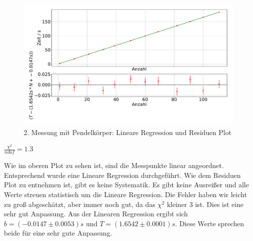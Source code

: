 \documentclass[twoside]{protokoll}
\begin{document}
\begin{figure}[H]
    \centering
    \includegraphics[width=1.0\textwidth]{plots/lineare_regression_gewicht_2.pdf}
    \caption{2. Messung mit Pendelkörper: Lineare Regression und Residuen Plot}
\end{figure}
\begin{center}
    $ \frac{\chi^2}{ndof}  =  1.3$
\end{center}
Wie im oberen Plot zu sehen ist, sind die Messpunkte linear angeordnet.
Entsprechend wurde eine Lineare Regression durchgeführt.
Wie dem Residuen Plot zu entnehmen ist, gibt es keine Systematik.
Es gibt keine Ausreißer und alle Werte streuen statistisch um die Lineare Regression.
Die Fehler haben wir leicht zu groß abgeschätzt, aber immer noch gut, da das $\chi^2$ kleiner 3 ist. Dies ist eine sehr gut Anpassung.
Aus der Linearen Regression ergibt sich $b = (-0.0147 \pm 0.0053)s$ und $T = (1.6542 \pm 0.0001)s$.
Diese Werte sprechen beide für eine sehr gute Anpassung.
\end{document}
